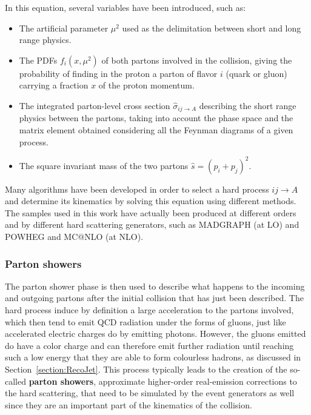 \documentclass[a4paper, 10pt, openright]{report}
\begin{document}
In this equation, several variables have been introduced, such as:
\begin{itemize}
\item The artificial parameter $\mu^2$ used as the delimitation between short and long range physics.
\item The \acfp{PDF} $f_i(x, \mu^2)$ of both partons involved in the collision, giving the probability of finding in the proton a parton of flavor $i$ (quark or gluon) carrying a fraction $x$ of the proton momentum.
\item The integrated parton-level cross section $\hat{\sigma}_{ij \rightarrow A}$ describing the short range physics between the partons, taking into account the phase space and the matrix element obtained considering all the Feynman diagrams of a given process.
\item The square invariant mass of the two partons $\hat{s} = (p_i + p_j)^2$.
\end{itemize}

Many algorithms have been developed in order to select a hard process $ij \rightarrow A$ and determine its kinematics by solving this equation using different methods. The samples used in this work have actually been produced at different orders and by different hard scattering generators, such as MADGRAPH \cite{MADGRAPH} (at LO) and POWHEG \cite{POWHEG} and MC@NLO \cite{MCNLO} (at NLO).

\subsubsection*{Parton showers}

The parton shower phase is then used to describe what happens to the incoming and outgoing partons after the initial collision that has just been described. The hard process induce by definition a large acceleration to the partons involved, which then tend to emit \ac{QCD} radiation under the forms of gluons, just like accelerated electric charges do by emitting photons. However, the gluons emitted do have a color charge and can therefore emit further radiation until reaching such a low energy that they are able to form colourless hadrons, as discussed in Section~\ref{section:RecoJet}. This process typically leads to the creation of the so-called \textbf{parton showers}, approximate higher-order real-emission corrections to the hard scattering, that need to be simulated by the event generators as well since they are an important part of the kinematics of the collision.
\end{document}
